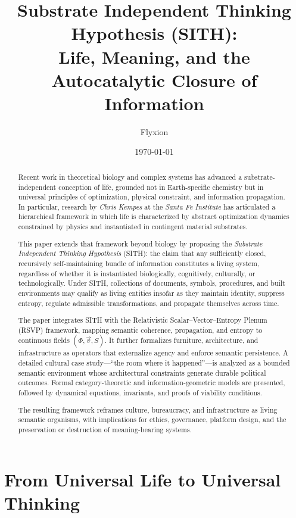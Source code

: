 \documentclass[11pt,oneside]{article}
\title{Substrate Independent Thinking Hypothesis (SITH):\\
Life, Meaning, and the Autocatalytic Closure of Information}
\author{Flyxion}
\date{\today}
\begin{document}
\maketitle

\begin{abstract}
Recent work in theoretical biology and complex systems has advanced a substrate-independent conception of life, grounded not in Earth-specific chemistry but in universal principles of optimization, physical constraint, and information propagation. In particular, research by \textit{Chris Kempes} at the \textit{Santa Fe Institute} has articulated a hierarchical framework in which life is characterized by abstract optimization dynamics constrained by physics and instantiated in contingent material substrates. 

This paper extends that framework beyond biology by proposing the \emph{Substrate Independent Thinking Hypothesis} (SITH): the claim that any sufficiently closed, recursively self-maintaining bundle of information constitutes a living system, regardless of whether it is instantiated biologically, cognitively, culturally, or technologically. Under SITH, collections of documents, symbols, procedures, and built environments may qualify as living entities insofar as they maintain identity, suppress entropy, regulate admissible transformations, and propagate themselves across time.

The paper integrates SITH with the Relativistic Scalar–Vector–Entropy Plenum (RSVP) framework, mapping semantic coherence, propagation, and entropy to continuous fields $(\Phi, \vec{v}, S)$. It further formalizes furniture, architecture, and infrastructure as operators that externalize agency and enforce semantic persistence. A detailed cultural case study—``the room where it happened''—is analyzed as a bounded semantic environment whose architectural constraints generate durable political outcomes. Formal category-theoretic and information-geometric models are presented, followed by dynamical equations, invariants, and proofs of viability conditions.

The resulting framework reframes culture, bureaucracy, and infrastructure as living semantic organisms, with implications for ethics, governance, platform design, and the preservation or destruction of meaning-bearing systems.
\end{abstract}

\section{From Universal Life to Universal Thinking}
\end{document}
